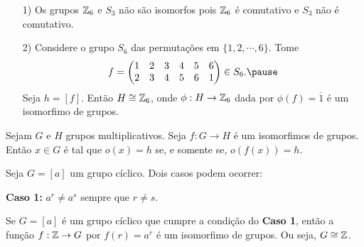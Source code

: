 \documentclass{beamer}
\begin{document}
    \begin{frame}
        \begin{exemplos}
            \vspace{.3cm}
            \begin{enumerate}
                \item[1)] Os grupos $\mathbb{Z}_6$ e $S_3$ \pause não são isomorfos \pause pois $\mathbb{Z}_6$ é comutativo \pause e $S_3$ não é comutativo.\pause

                \vspace{.3cm}

                \item[2)] Considere o grupo $S_6$ das permutações em $\{1, 2, \cdots, 6\}$. \pause Tome
                \[
                    f = \begin{pmatrix}
                        1 & 2 & 3 & 4 & 5 & 6\\
                        2 & 3 & 4 & 5 & 6 & 1
                    \end{pmatrix} \in S_6. \pause
                \]
                Seja $h = [f]$. \pause Então $H \cong \mathbb{Z}_6$, \pause onde $\phi : H \to \mathbb{Z}_6$ dada por $\phi(f) = \overline{1}$ \pause é um isomorfimo de grupos. \pause
                
                \vspace{.3cm}

            \end{enumerate}
        \end{exemplos}
    \end{frame}

    \begin{frame}
        \begin{proposicao}
            Sejam $G$ e $H$ grupos multiplicativos. \pause Seja $f : G \to H$ é um isomorfimos de grupos. \pause Então $x \in G$ \pause é tal que $o(x) = h$ \pause se, e somente se, $o(f(x)) = h$.\pause
        \end{proposicao}
    \end{frame}

    \begin{frame}
        Seja $G = [a]$ um grupo cíclico. \pause Dois casos podem ocorrer: \pause

        \textbf{Caso 1:} $a^r \ne a^s$ \pause sempre que $r \ne s$.\pause
    \end{frame}

    \begin{frame}
        \begin{proposicao}
            Se $G = [a]$ é um grupo cíclico que cumpre a condição do \textbf{Caso 1}, \pause então a função $f : \mathbb{Z} \to G$ por $f(r) = a^r$ \pause é um isomorfimo de grupos. \pause Ou seja, $G \cong \mathbb{Z}$.\pause
        \end{proposicao}
    \end{frame}
\end{document}
